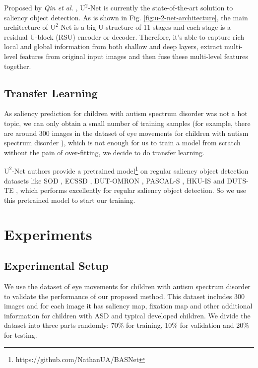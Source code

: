 \documentclass[journal]{IEEEtran}
\begin{document}
Proposed by \textit{Qin et al.} \cite{Qin_2020_PR}, $\text{U}^2$-Net is currently the state-of-the-art solution to saliency object detection. As is shown in Fig. \ref{fig:u-2-net-architecture}, the main architecture of $\text{U}^2$-Net is a big U-structure of 11 stages and each stage is a residual U-block (RSU) \cite{Qin_2020_PR} encoder or decoder. Therefore, it's able to capture rich local and global information from both shallow and deep layers, extract multi-level features from original input images and then fuse these multi-level features together. 

\subsection{Transfer Learning}

As saliency prediction for children with autism spectrum disorder was not a hot topic, we can only obtain a small number of training samples (for example, there are around 300 images in the dataset of eye movements for children with autism spectrum disorder \cite{duan_huiyu_2019_2647418}), which is not enough for us to train a model from scratch without the pain of over-fitting, we decide to do transfer learning.

$\text{U}^2$-Net authors provide a pretrained model\footnote{https://github.com/NathanUA/BASNet} on regular saliency object detection datasets like SOD \cite{newell2016stacked}, ECSSD \cite{yan2013hierarchical}, DUT-OMRON \cite{yang2013saliency}, PASCAL-S \cite{li2014secrets}, HKU-IS \cite{li2016visual} and DUTS-TE \cite{wang2017learning}, which performs excellently for regular saliency object detection. So we use this pretrained model to start our training.

\section{Experiments}

\subsection{Experimental Setup}

We use the dataset of eye movements for children with autism spectrum disorder \cite{duan_huiyu_2019_2647418} to validate the performance of our proposed method. This dataset includes 300 images and for each image it has saliency map, fixation map and other additional information for children with ASD and typical developed children. We divide the dataset into three parts randomly: 70\% for training, 10\% for validation and 20\% for testing.
\end{document}
